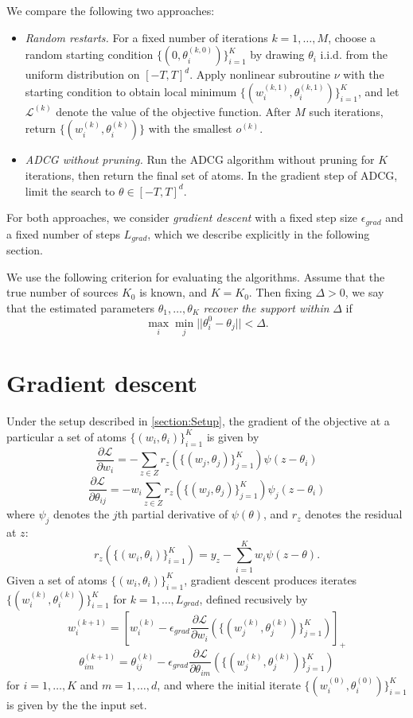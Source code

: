 \documentclass[11pt]{article}
\begin{document}
We compare the following two approaches:
\begin{itemize}
\item \emph{Random restarts.} 
For a fixed number of iterations $k = 1,\hdots, M$,
choose a random starting condition $\{(0, \theta_i^{(k, 0)})\}_{i=1}^K$
by drawing $\theta_i$ i.i.d. from the uniform distribution on $[-T,T]^d$.
Apply nonlinear subroutine $\nu$ with the starting condition
to obtain local minimum $\{(w_i^{(k, 1)}, \theta_i^{(k, 1)})\}_{i=1}^K$,
and let $\mathcal{L}^{(k)}$ denote the value of the objective function.
After $M$ such iterations, return $\{(w_i^{(k)}, \theta_i^{(k)})\}$ with the smallest $o^{(k)}$.
\item \emph{ADCG without pruning.}
Run the ADCG algorithm without pruning for $K$ iterations, then return the final set of atoms.
In the gradient step of ADCG, limit the search to $\theta \in [-T, T]^d$.
\end{itemize}

For both approaches, we consider \emph{gradient descent} with a fixed
step size $\epsilon_{grad}$ and a fixed number of steps $L_{grad}$, which we
describe explicitly in the following section.

We use the following criterion for evaluating the algorithms.
Assume that the true number of sources $K_0$ is known, and $K = K_0$.
Then fixing $\Delta > 0$, we say that the estimated parameters $\theta_1,\hdots, \theta_K$
\emph{recover the support within} $\Delta$ if
\[
\max_i \min_j ||\theta_i^0 - \theta_j|| < \Delta.
\]

\section{Gradient descent}

Under the setup described in \ref{section:Setup},
the gradient of the objective at a particular a set of atoms $\{(w_i, \theta_i)\}_{i=1}^K$
is given by
\[
\frac{\partial \mathcal{L}}{\partial w_i} = -\sum_{z \in Z} r_z(\{(w_j, \theta_j)\}_{j=1}^K) \psi(z - \theta_i)
\]
\[
\frac{\partial \mathcal{L}}{\partial \theta_{ij}} = -w_i\sum_{z \in Z} r_z(\{(w_j, \theta_j)\}_{j=1}^K) \psi_j(z - \theta_i)
\]
where $\psi_j$ denotes the $j$th partial derivative of $\psi(\theta)$, and $r_z$ denotes the residual at $z$:
\[
r_z(\{(w_i, \theta_i)\}_{i=1}^K) = y_z - \sum_{i=1}^K w_i \psi(z - \theta).
\]
Given a set of atoms $\{(w_i, \theta_i)\}_{i=1}^K$, gradient descent produces iterates
$\{(w_i^{(k)}, \theta_i^{(k)})\}_{i=1}^K$ for $k = 1,\hdots, L_{grad}$,
defined recusively by
\[
w_i^{(k + 1)} = \left[w_i^{(k)} - \epsilon_{grad} \frac{\partial \mathcal{L}}{\partial w_i}(\{(w_j^{(k)}, \theta_j^{(k)})\}_{j=1}^K)\right]_+
\]
\[
\theta_{im}^{(k + 1)} = \theta_{ij}^{(k)} - \epsilon_{grad} \frac{\partial \mathcal{L}}{\partial \theta_{im}}(\{(w_j^{(k)}, \theta_j^{(k)})\}_{j=1}^K)
\]
for $i = 1,\hdots, K$ and $m=1,\hdots, d$, and where the initial iterate $\{(w_i^{(0)},
\theta_i^{(0)})\}_{i=1}^K$ is given by the the input set.
\end{document}
